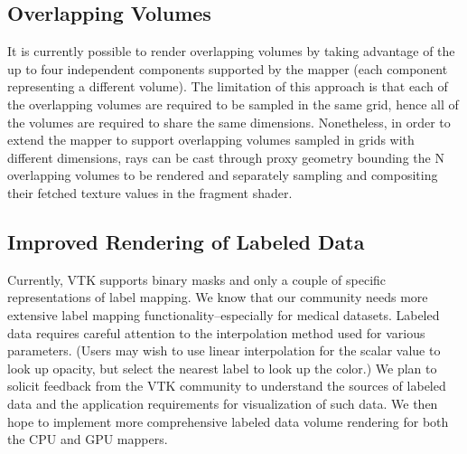 \subsection{Overlapping Volumes}
\label{overlapping-volumes}
It is currently possible to render overlapping volumes by taking advantage of
the up to four independent components supported by the mapper (each component
representing a different volume).
The limitation of this approach is that each of the overlapping volumes are
required to be sampled in the same grid, hence all of the volumes are required
to share the same dimensions.  Nonetheless, in order to extend the mapper to
support overlapping volumes sampled in grids with different dimensions, rays
can be cast through proxy geometry bounding the N overlapping volumes to be
rendered and separately sampling and compositing their fetched texture values in
the fragment shader.

\subsection{Improved Rendering of Labeled Data}
\label{improved-rendering-of-labeled-data}
Currently, VTK supports binary masks and only a couple of specific
representations of label mapping. We know that our community needs more
extensive label mapping functionality--especially for medical datasets. Labeled
data requires careful attention to the interpolation method used for various
parameters. (Users may wish to use linear interpolation for the scalar value to
look up opacity, but select the nearest label to look up the color.) We plan to
solicit feedback from the VTK community to understand the sources of labeled
data and the application requirements for visualization of such data. We then
hope to implement more comprehensive labeled data volume rendering for both the
CPU and GPU mappers.
